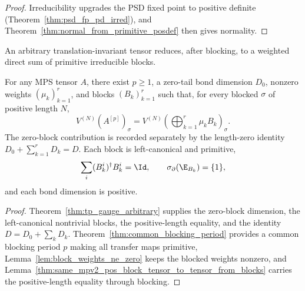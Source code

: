 \begin{proof}\leanok
    Irreducibility upgrades the PSD fixed point to positive definite
    (Theorem~\ref{thm:psd_fp_pd_irred}), and
    Theorem~\ref{thm:normal_from_primitive_posdef} then gives normality.
\end{proof}

An arbitrary translation-invariant tensor reduces, after blocking, to a weighted
direct sum of primitive irreducible blocks.

\begin{theorem}%
    \label{thm:tp_primitive_blockdecomp}
    \leanok
    For any MPS tensor $A$, there exist $p\ge 1$, a zero-tail bond dimension
    $D_0$, nonzero weights $(\mu_k)_{k=1}^r$, and blocks $(B_k)_{k=1}^r$ such
    that, for every blocked $\sigma$ of positive length $N$,
    \[
        V^{(N)}\!(A^{[p]})_\sigma
        = V^{(N)}\!(\textstyle\bigoplus_{k=1}^{r} \mu_k B_k)_\sigma.
    \]
    The zero-block contribution is recorded separately by the length-zero
    identity $D_0 + \sum_{k=1}^{r} D_k = D$. Each block is left-canonical and
    primitive,
    \[
        \sum_i (B_k^i)^\dagger B_k^i = \Id,
        \qquad
        \sigma_\partial(\E_{B_k})=\{1\},
    \]
    and each bond dimension is positive.
\end{theorem}

\begin{proof}\leanok
    Theorem~\ref{thm:tp_gauge_arbitrary} supplies the zero-block dimension, the
    left-canonical nontrivial blocks, the positive-length equality, and the
    identity $D = D_0 + \sum_k D_k$.
    Theorem~\ref{thm:common_blocking_period} provides a common blocking period
    $p$ making all transfer maps primitive,
    Lemma~\ref{lem:block_weights_ne_zero} keeps the blocked weights nonzero, and
    Lemma~\ref{thm:same_mpv2_pos_block_tensor_to_tensor_from_blocks} carries
    the positive-length equality through blocking.
\end{proof}


